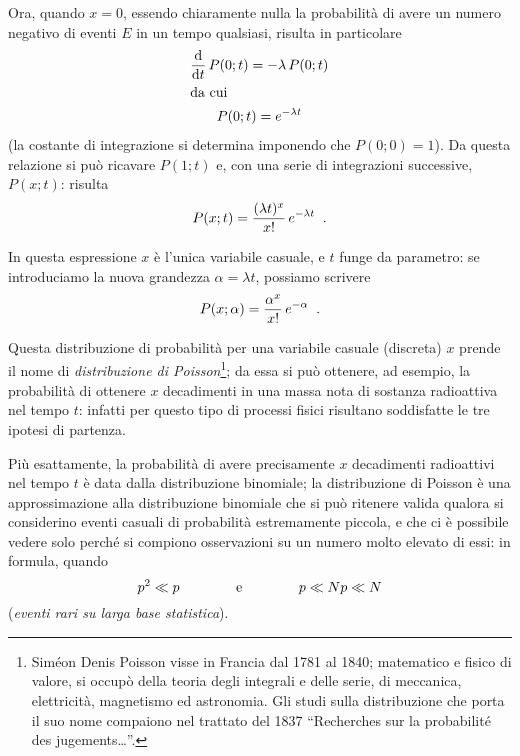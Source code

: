 Ora, quando $x=0$, essendo chiaramente nulla la
probabilit\`a di avere un numero negativo di eventi $E$ in
un tempo qualsiasi, risulta in particolare
\begin{gather*}
  \frac{\mathrm{d}}{\mathrm{d} t} \, P(0;t) =
    - \lambda \, P(0;t) \\
  \intertext{da cui}
  P(0;t) = e^{- \lambda t}
\end{gather*}
(la costante di integrazione si determina imponendo che
$P(0;0)=1 $).  Da questa relazione si pu\`o ricavare
$P(1;t)$ e, con una serie di integrazioni successive,
$P(x;t)$: risulta
\begin{equation} \label{eq:8.poisson}
  P(x;t) = \frac{ (\lambda t)^x }{ x! } \,
    e^{-\lambda t} \;\; .
\end{equation}

In questa espressione $x$ \`e l'unica variabile casuale, e
$t$ funge da parametro: se introduciamo la nuova grandezza
$\alpha = \lambda t$, possiamo scrivere
\begin{equation} \label{eq:8.poiss2}
  P(x;\alpha) = \frac{\alpha^x}{x!} \, e^{-\alpha} \;\; .
\end{equation}

Questa distribuzione di probabilit\`a per una variabile
casuale (discreta) $x$ prende il nome di \emph{distribuzione
  di Poisson}\thinspace\footnote{Sim\'eon Denis Poisson
  visse in Francia dal 1781 al 1840; matematico e fisico di
  valore, si occup\`o della teoria degli integrali e delle
  serie, di meccanica, elettricit\`a, magnetismo ed
  astronomia.  Gli studi sulla distribuzione che porta il
  suo nome compaiono nel trattato del 1837 ``Recherches sur
  la probabilit\'e des jugements\ldots''.};%
 da essa si pu\`o ottenere, ad
esempio, la probabilit\`a di ottenere $x$ decadimenti in una
massa nota di sostanza radioattiva nel tempo $t$: infatti
per questo tipo di processi fisici risultano soddisfatte le
tre ipotesi di partenza.

%
Pi\`u esattamente, la probabilit\`a di avere precisamente
$x$ decadimenti radioattivi nel tempo $t$ \`e data dalla
distribuzione binomiale; la distribuzione di Poisson \`e una
approssimazione alla distribuzione binomiale che si pu\`o
ritenere valida qualora si considerino eventi casuali di
probabilit\`a estremamente piccola, e che ci \`e possibile
vedere solo perch\'e si compiono osservazioni su un numero
molto elevato di essi: in formula, quando
\begin{equation} \label{eq:8.poival}
  p^2 \ll p \makebox[30mm]{e} p \ll Np \ll N
\end{equation}
(\emph{eventi rari su larga base statistica}).

